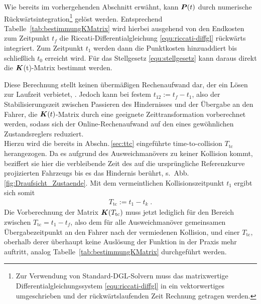 Wie bereits im vorhergehenden Abschnitt erwähnt, kann $\boldsymbol{P}(t)$ durch numerische Rückwärtsintegration\footnote{Zur Verwendung von Standard-DGL-Solvern muss das matrixwertige Differentialgleichungssystem \eqref{equ:riccati-diffgl} in ein vektorwertiges umgeschrieben und der rückwärtslaufenden Zeit Rechnung getragen werden.} gelöst werden. Entsprechend Tabelle~\ref{tab:bestimmungKMatrix} wird hierbei ausgehend von den Endkosten zum Zeitpunkt $t_f$ die Riccati-Differentialgleichung \eqref{equ:riccati-diffgl} rückwärts integriert. Zum Zeitpunkt $t_1$ werden dann die Punktkosten hinzuaddiert bis schließlich $t_0$ erreicht wird. Für das Stellgesetz \eqref{equ:stellgesetz} kann daraus direkt die $\boldsymbol{K}$(t)-Matrix bestimmt werden.

Diese Berechnung stellt keinen übermäßigen Rechenaufwand dar, der ein Lösen zur Laufzeit verbietet, \vgl \cite{Graichen2012, Buskens09}. %
Jedoch kann bei festem $t_{12}:=t_f - t_1$, also der Stabilisierungszeit zwischen Passieren des Hindernisses und der Übergabe an den Fahrer, die $\boldsymbol{K}(t)$-Matrix durch eine geeignete Zeittransformation vorberechnet werden, sodass sich der Online-Rechenaufwand auf den eines gewöhnlichen Zustandsreglers reduziert. \\
Hierzu wird die bereits in Abschn.\,\ref{sec:ttc} eingeführte time-to-collision $T_\text{tc}$ herangezogen. Da es aufgrund des Ausweichmanövers zu keiner Kollision kommt, beziffert sie hier die verbleibende Zeit des auf die ursprüngliche Referenzkurve projizierten Fahrzeugs bis es das Hindernis berührt, s.\ Abb.\,\ref{fig:Draufsicht_Zustaende}. Mit dem vermeintlichen Kollisionszeitpunkt $t_1$ ergibt sich somit
\begin{align*}
	T_\text{tc} := t_1-t_k \; .  %
\end{align*}
Die Vorberechnung der Matrix $\boldsymbol{K}(T_\text{tc})$ muss jetzt lediglich für den Bereich zwischen $T_\text{tc} = t_1-t_f$, also dem für alle Ausweichmanöver gemeinsamen Übergabezeitpunkt an den Fahrer nach der vermiedenen Kollision, und einer $T_\text{tc}$, oberhalb derer überhaupt keine Auslösung der Funktion in der Praxis mehr auftritt, analog Tabelle~\ref{tab:bestimmungKMatrix} durchgeführt werden.

